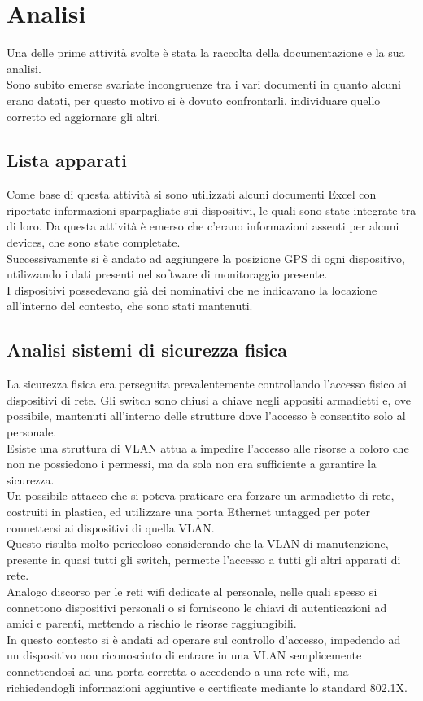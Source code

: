 \documentclass[Realizzazione.tex]{subfiles}
\begin{document}
\section{Analisi}

Una delle prime attività svolte è stata la raccolta della documentazione e la sua analisi. \\
Sono subito emerse svariate incongruenze tra i vari documenti in quanto alcuni erano datati, per questo motivo si è dovuto confrontarli, individuare quello corretto ed aggiornare gli altri. \\

\subsection{Lista apparati}
Come base di questa attività si sono utilizzati alcuni documenti Excel con riportate informazioni sparpagliate sui dispositivi, le quali sono state integrate tra di loro. Da questa attività è emerso che c'erano informazioni assenti per alcuni devices, che sono state completate. \\
Successivamente si è andato ad aggiungere la posizione GPS di ogni dispositivo, utilizzando i dati presenti nel software di monitoraggio presente. \\
I dispositivi possedevano già dei nominativi che ne indicavano la locazione all'interno del contesto, che sono stati mantenuti. \\

\subsection{Analisi sistemi di sicurezza fisica}
La sicurezza fisica era perseguita prevalentemente controllando l'accesso fisico ai dispositivi di rete. Gli switch sono chiusi a chiave negli appositi armadietti e, ove possibile, mantenuti all'interno delle strutture dove l'accesso è consentito solo al personale. \\
Esiste una struttura di VLAN attua a impedire l'accesso alle risorse a coloro che non ne possiedono i permessi, ma da sola non era sufficiente a garantire la sicurezza. \\
Un possibile attacco che si poteva praticare era forzare un armadietto di rete, costruiti in plastica, ed utilizzare una porta Ethernet untagged per poter connettersi ai dispositivi di quella VLAN. \\
Questo risulta molto pericoloso considerando che la VLAN di manutenzione, presente in quasi tutti gli switch, permette l'accesso a tutti gli altri apparati di rete. \\
Analogo discorso per le reti wifi dedicate al personale, nelle quali spesso si connettono dispositivi personali o si forniscono le chiavi di autenticazioni ad amici e parenti, mettendo a rischio le risorse raggiungibili. \\
In questo contesto si è andati ad operare sul controllo d'accesso, impedendo ad un dispositivo non riconosciuto di entrare in una VLAN semplicemente connettendosi ad una porta corretta o accedendo a una rete wifi, ma richiedendogli informazioni aggiuntive e certificate mediante lo standard 802.1X.
\end{document}
